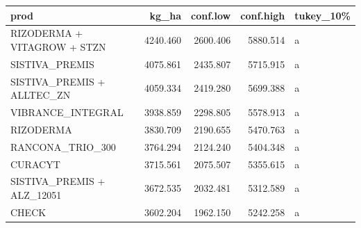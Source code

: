 \documentclass[
  letterpaper,
  DIV=11,
  numbers=noendperiod]{scrartcl}
\begin{document}
\begin{longtable}[]{@{}lrrrl@{}}
\toprule()
prod & kg\_ha & conf.low & conf.high & tukey\_10\% \\
\midrule()
\endhead
RIZODERMA + VITAGROW + STZN & 4240.460 & 2600.406 & 5880.514 & a \\
SISTIVA\_PREMIS & 4075.861 & 2435.807 & 5715.915 & a \\
SISTIVA\_PREMIS + ALLTEC\_ZN & 4059.334 & 2419.280 & 5699.388 & a \\
VIBRANCE\_INTEGRAL & 3938.859 & 2298.805 & 5578.913 & a \\
RIZODERMA & 3830.709 & 2190.655 & 5470.763 & a \\
RANCONA\_TRIO\_300 & 3764.294 & 2124.240 & 5404.348 & a \\
CURACYT & 3715.561 & 2075.507 & 5355.615 & a \\
SISTIVA\_PREMIS + ALZ\_12051 & 3672.535 & 2032.481 & 5312.589 & a \\
CHECK & 3602.204 & 1962.150 & 5242.258 & a \\
\bottomrule()
\end{longtable}
\end{document}

